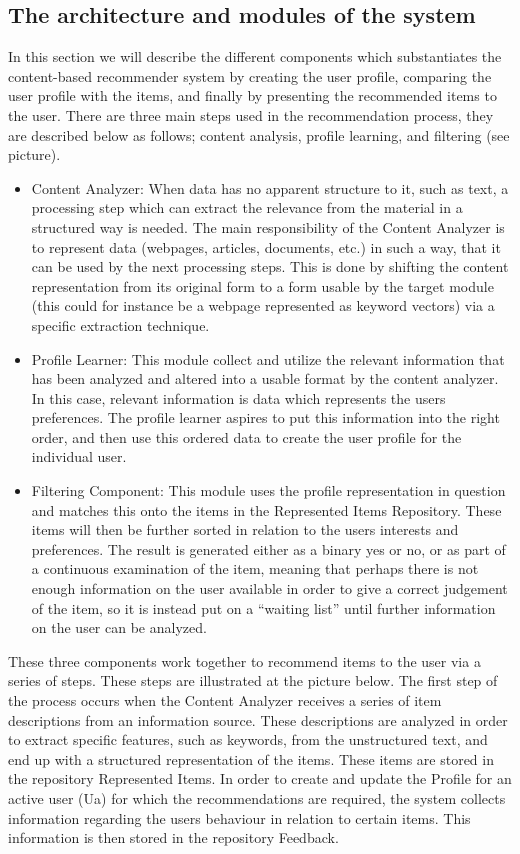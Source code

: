 \subsection{The architecture and modules of the system}
In this section we will describe the different components which substantiates the content-based recommender system by creating the user profile, comparing the user profile with the items, and finally by presenting the recommended items to the user. 
There are three main steps used in the recommendation process, they are described below as follows; content analysis, profile learning, and filtering (see picture).
\begin{itemize}
	\item Content Analyzer: When data has no apparent structure to it, such as text, a processing step which can extract the relevance from the material in a structured way is needed. The main responsibility of the Content Analyzer is to represent data (webpages, articles, documents, etc.) in such a way, that it can be used by the next processing steps. This is done by shifting the content representation from its original form to a form usable by the target module (this could for instance be a webpage represented as keyword vectors) via a specific extraction technique.
	\item Profile Learner: This module collect and utilize the relevant information that has been analyzed and altered into a usable format by the content analyzer. In this case, relevant information is data which represents the users preferences. The profile learner aspires to put this information into the right order, and then use this ordered data to create the user profile for the individual user.
	\item Filtering Component: This module uses the profile representation in question and matches this onto the items in the Represented Items Repository. These items will then be further sorted in relation to the users interests and preferences. The result is generated either as a binary yes or no, or as part of a continuous examination of the item, meaning that perhaps there is not enough information on the user available in order to give a correct judgement of the item, so it is instead put on a “waiting list” until further information on the user can be analyzed.
\end{itemize}
These three components work together to recommend items to the user via a series of steps. These steps are illustrated at the picture below. The first step of the process occurs when the Content Analyzer receives a series of item descriptions from an information source. These descriptions are analyzed in order to extract specific features, such as keywords, from the unstructured text, and end up with a structured representation of the items. These items are stored in the repository Represented Items. In order to create and update the Profile for an active user (Ua) for which the recommendations are required, the system collects information regarding the users behaviour in relation to certain items. This information is then stored in the repository Feedback.
